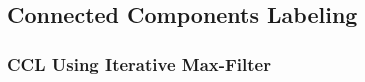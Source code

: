 \documentclass[a4paper,12pt]{article}
\begin{document}
\subsection{Connected Components Labeling}



\subsubsection{CCL Using Iterative Max-Filter}


\end{document}
